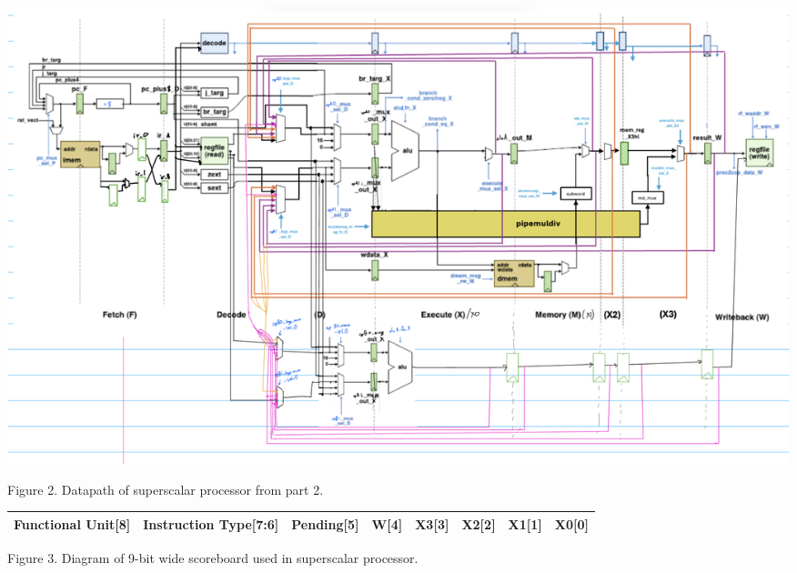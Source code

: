\documentclass[11pt]{article}
\begin{document}
\begin{center}
\includegraphics[scale=0.20]{./ssc-datapath.jpg}
\end{center}
Figure 2. Datapath of superscalar processor from part 2. \\


\begin{center}
    \begin{tabular}{|p{1in}| p{1in}| p{0.8in} | p{0.4in} | p{0.4in}| p{0.4in} | p{0.4in} | p{0.4in} |} 
 \hline
 Functional Unit[8] & Instruction Type[7:6] & Pending[5] & W[4] & X3[3] & X2[2] & X1[1]  & X0[0] \\
 \hline

\end{tabular}
\end{center}
Figure 3. Diagram of 9-bit wide scoreboard used in superscalar processor. \\
\end{document}
